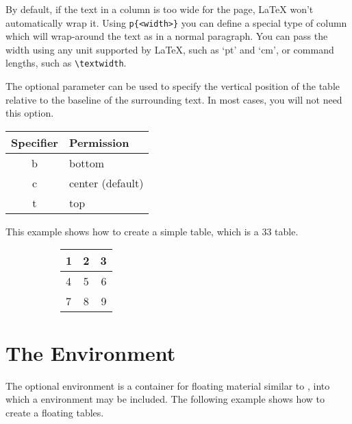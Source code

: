 By default, if the text in a column is too wide for the page, \LaTeX{} won’t automatically wrap it. Using \verb|p{<width>}| you can define a special type of column which will wrap-around the text as in a normal paragraph. You can pass the width using any unit supported by \LaTeX{}, such as `pt' and `cm', or command lengths, such as \verb|\textwidth|. 

The optional parameter  can be used to specify the vertical position of the table relative to the baseline of the surrounding text. In most cases, you will not need this option.

\begin{tabular}{cl}
    \toprule
    Specifier & Permission \\
    \midrule
    b & bottom \\
    c & center (default) \\
    t & top \\
    \bottomrule
\end{tabular}

This example shows how to create a simple table, which is a 3\texttimes{}3 table.

\begin{figure}[h]
    \centering
    \begin{subfigure}{.45\linewidth}
        \centering
        
    \end{subfigure}%
    \begin{subfigure}{.3\linewidth}
        \begin{tabular}{ l | c | r }
            \toprule
            1 & 2 & 3 \\ \hline
            4 & 5 & 6 \\ \hline
            7 & 8 & 9 \\
            \bottomrule
        \end{tabular}
    \end{subfigure}
\end{figure}

\section{The  Environment}
\label{content:tables:table}

The optional  environment is a container for floating material similar to , into which a  environment may be included. The following example shows how to create a floating tables.


